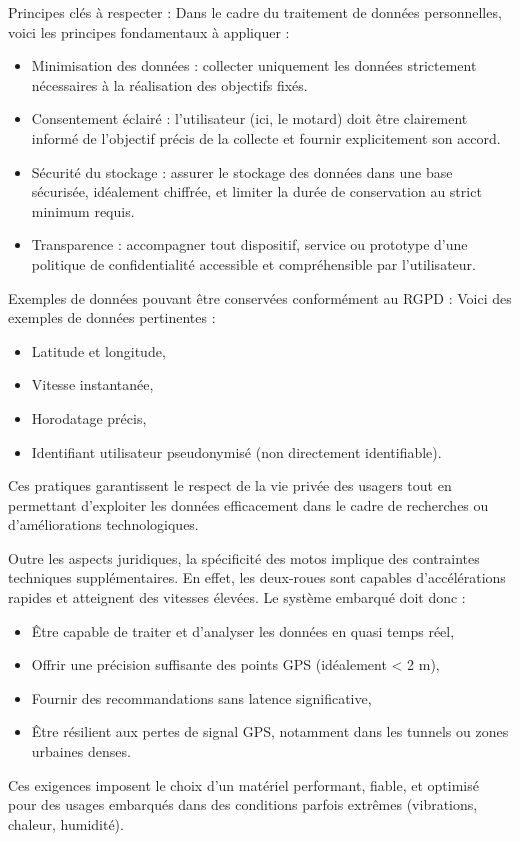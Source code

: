 Principes clés à respecter : Dans le cadre du traitement de données personnelles, voici les principes fondamentaux à appliquer :
\begin{itemize}
\item Minimisation des données : collecter uniquement les données strictement nécessaires à la réalisation des objectifs fixés.
\item Consentement éclairé : l'utilisateur (ici, le motard) doit être clairement informé de l'objectif précis de la collecte et fournir explicitement son accord.
\item Sécurité du stockage : assurer le stockage des données dans une base sécurisée, idéalement chiffrée, et limiter la durée de conservation au strict minimum requis.
\item Transparence : accompagner tout dispositif, service ou prototype d'une politique de confidentialité accessible et compréhensible par l'utilisateur.
\end{itemize}

Exemples de données pouvant être conservées conformément au RGPD : Voici des exemples de données pertinentes :
\begin{itemize}
\item Latitude et longitude,
\item Vitesse instantanée,
\item Horodatage précis,
\item Identifiant utilisateur pseudonymisé (non directement identifiable).
\end{itemize}

Ces pratiques garantissent le respect de la vie privée des usagers tout en permettant d’exploiter les données efficacement dans le cadre de recherches ou d’améliorations technologiques.
\vspace{0.5cm}

Outre les aspects juridiques, la spécificité des motos implique des contraintes techniques supplémentaires. En effet, les deux-roues sont capables d’accélérations rapides et atteignent des vitesses élevées. Le système embarqué doit donc :
\begin{itemize}
  \item Être capable de traiter et d’analyser les données en quasi temps réel,
  \item Offrir une précision suffisante des points GPS (idéalement < 2 m),
  \item Fournir des recommandations sans latence significative,
  \item Être résilient aux pertes de signal GPS, notamment dans les tunnels ou zones urbaines denses.
\end{itemize}
Ces exigences imposent le choix d’un matériel performant, fiable, et optimisé pour des usages embarqués dans des conditions parfois extrêmes (vibrations, chaleur, humidité).
\vspace{0.5cm}

